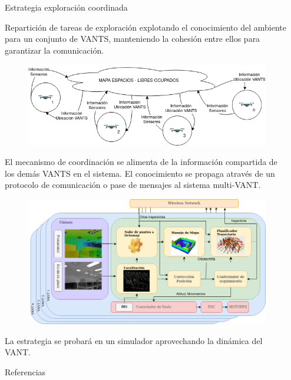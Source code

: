 \documentclass[final]{beamer}
\newlength{\sepwidth}
\newlength{\colwidth}
\newcommand{\separatorcolumn}{\begin{column}{\sepwidth}\end{column}}
\begin{document}
\begin{frame}[t]
\begin{columns}[t]
\begin{column}{\colwidth}
  \begin{block}{\color{teal}Estrategia exploración coordinada}

    Repartición de tareas de exploración explotando el conocimiento del ambiente para un conjunto de VANTS, manteniendo la cohesión entre ellos para garantizar la comunicación. \cite{LEAL2013}
    \begin{figure}
      \centering
      \includegraphics[width=32cm]{images/problema.png}
    \end{figure}
    El mecanismo de coordinación se alimenta de la información compartida de los demás VANTS en el sistema. El conocimiento se propaga através de un protocolo de comunicación o pase de mensajes al sistema multi-VANT.
    \begin{figure}
      \centering
      \includegraphics[width=32cm]{images/arquitectura.png}
    \end{figure}
  \end{block}
  La estrategia se probará en un simulador aprovechando la dinámica del VANT. \vspace{1cm}
  \begin{block}{\small{\color{teal}Referencias}}
    \begin{multicols}{3}
    \nocite{*}
    \tiny{}
    \end{multicols}
  \end{block}

\end{column}

\separatorcolumn
\end{columns}
\end{frame}
\end{document}

